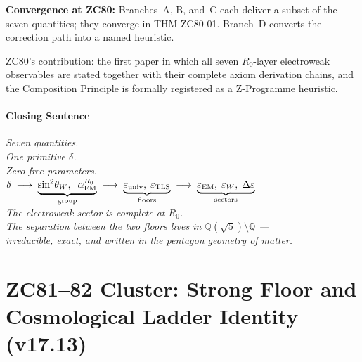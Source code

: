 \documentclass[12pt, a4paper]{article}
\begin{document}
\begin{genealogybox}[title={How ZC80's Key Objects Trace Back}]
\textbf{Convergence at ZC80:}
Branches~A, B, and~C each deliver a subset of the seven
quantities; they converge in THM-ZC80-01.
Branch~D converts the correction path into a named heuristic.

ZC80's contribution: the first paper in which all seven
$R_0$-layer electroweak observables are stated together
with their complete axiom derivation chains, and the
Composition Principle is formally registered as a
Z-Programme heuristic.
\end{genealogybox}

\subsection{Closing Sentence}

\bigskip
\begin{center}
\textit{%
  Seven quantities.\\[0.3em]
  One primitive $\delta$.\\[0.3em]
  Zero free parameters.\\[0.5em]
  $\displaystyle
    \delta
    \;\longrightarrow\;
    \underbrace{\sin^2\!\theta_W,\;\;\alpha_{\rm EM}^{R_0}}_{\text{group}}
    \;\longrightarrow\;
    \underbrace{\varepsilon_{\rm univ},\;\varepsilon_{\rm TLS}}_{\text{floors}}
    \;\longrightarrow\;
    \underbrace{\varepsilon_{\rm EM},\;\varepsilon_W,\;\Delta\varepsilon}_{\text{sectors}}
  $\\[0.5em]
  The electroweak sector is complete at $R_0$.\\[0.3em]
  The separation between the two floors lives in
  $\mathbb{Q}(\sqrt{5})\setminus\mathbb{Q}$ ---\\
  irreducible, exact, and written in the pentagon geometry of matter.
}
\end{center}



\newpage
\part{ZC81--82 Cluster: Strong Floor and Cosmological Ladder
  Identity (v17.13)}
\label{part:LI}
\end{document}
